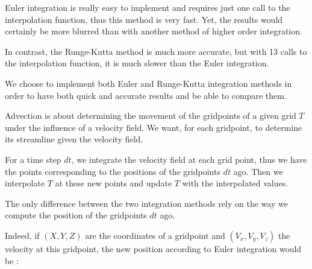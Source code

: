 \documentclass[accepted,single]{gipaper}
\begin{document}

Euler integration is really easy to implement and requires just one call to the interpolation function, thus this method is very fast. Yet, the results would certainly be more blurred than with another method of higher order integration.

In contrast, the Runge-Kutta method is much more accurate, but with 13 calls to the interpolation function, it is much slower than the Euler integration.


We choose to implement both Euler and Runge-Kutta integration methods in order to have both quick and accurate results and be able to compare them.


Advection is about determining the movement of the gridpoints of a given grid $T$ under the influence of a velocity field. We want, for each gridpoint, to determine its streamline given the velocity field. 

For a time step $dt$, we integrate the velocity field at each grid point, thus we have the points corresponding to the positions of the gridpoints $dt$ ago. Then we interpolate $T$ at these new points and update $T$  with the interpolated values.

The only difference between the two integration methods rely on the way we compute the position of the gridpoints $dt$ ago. 

Indeed, if $(X,Y,Z)$  are the coordinates of a gridpoint and $(V_x,V_y,V_z)$ the velocity at this gridpoint, the new position according to Euler integration would be :
\end{document}
